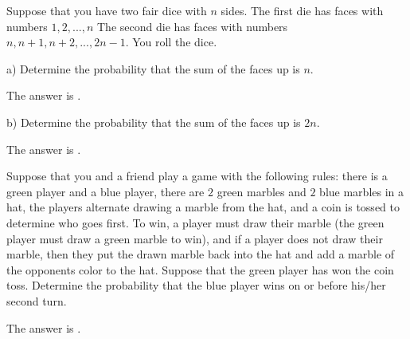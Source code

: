 \documentclass{ximera}
\begin{document}
\begin{question}
Suppose that you have two fair dice with $n$ sides.  The first die has faces with numbers $1, 2, ..., n$  The second die has faces with numbers $n, n+1, n+2, ..., 2n-1$.  You roll the dice.

a)  Determine the probability that the sum of the faces up is $n$.
     \begin{solution}
           The answer is .
     \end{solution}

b)  Determine the probability that the sum of the faces up is $2n$.
     \begin{solution}
           The answer is .
     \end{solution}
\end{question}

\begin{question}
Suppose that you and a friend play a game with the following rules:  there is a green player and a blue player,  there are $2$ green marbles and $2$ blue marbles in a hat, the players alternate drawing a marble from the hat, and a coin is tossed to determine who goes first.  To win, a player must draw their marble (the green player must draw a green marble to win), and if a player does not draw their marble, then they put the drawn marble back into the hat and add a marble of the opponents color to the hat.  Suppose that the green player has won the coin toss.  Determine the probability that the blue player wins on or before his/her second turn.
     \begin{solution}
           The answer is .
     \end{solution}
\end{question}
\end{document}
